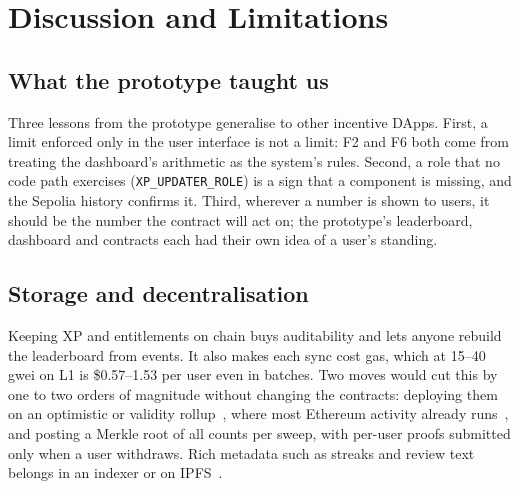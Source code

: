 \documentclass[conference]{IEEEtran}
\begin{document}
\section{Discussion and Limitations}\label{sec:discussion}

\subsection{What the prototype taught us}
Three lessons from the prototype generalise to other incentive DApps. First, a limit enforced only in the user interface is not a limit: F2 and F6 both come from treating the dashboard's arithmetic as the system's rules. Second, a role that no code path exercises (\texttt{XP\_UPDATER\_ROLE}) is a sign that a component is missing, and the Sepolia history confirms it. Third, wherever a number is shown to users, it should be the number the contract will act on; the prototype's leaderboard, dashboard and contracts each had their own idea of a user's standing.

\subsection{Storage and decentralisation}
Keeping XP and entitlements on chain buys auditability and lets anyone rebuild the leaderboard from events. It also makes each sync cost gas, which at 15--40\,gwei on L1 is \$0.57--1.53 per user even in batches. Two moves would cut this by one to two orders of magnitude without changing the contracts: deploying them on an optimistic or validity rollup~\cite{kalodner2018arbitrum,thibault2022rollups}, where most Ethereum activity already runs~\cite{ethorg2026}, and posting a Merkle root of all counts per sweep, with per-user proofs submitted only when a user withdraws. Rich metadata such as streaks and review text belongs in an indexer or on IPFS~\cite{benet2014ipfs}.
\end{document}
